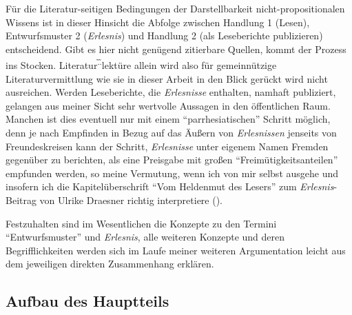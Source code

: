 \documentclass[fontsize=12pt]{scrartcl}
\begin{document}
F\"ur die Li\-te\-ra\-tur-seitigen Bedingungen der Darstellbarkeit nicht-pro\-po\-si\-ti\-o\-na\-len Wissens ist in dieser Hinsicht die Abfolge zwischen Handlung 1 (Lesen), Entwurfsmuster 2 (\textit{Erlesnis}) und Handlung 2 (als Leseberichte pu\-bli\-zieren) entscheidend. Gibt es \mbox{hier} nicht gen\"ugend zitierbare Quellen, kommt der Prozess ins Stocken. Li\-te\-ra\-tur\textsuperscript{\~.\~.}lekt\"ure allein wird also f\"ur gemeinn\"utzige Li\-te\-ra\-tur\-ver\-mitt\-lung wie sie in dieser Arbeit in den Blick ger\"uckt wird nicht ausreichen. Werden Leseberichte, die \textit{Erlesnisse} enthalten, namhaft pu\-bli\-ziert, gelangen aus meiner Sicht sehr wertvolle Aussagen in den \"of\-fent\-lichen Raum. Manchen ist dies eventuell nur mit einem "`parrhesiatischen"' Schritt m\"oglich, denn je nach Empfinden in Bezug auf das \"Au{\ss}ern von \textit{Erlesnissen} jenseits von Freund\textsuperscript{\tiny *}eskreisen kann der Schritt, \textit{Erlesnisse} unter eigenem Namen Fremden gegen\"uber zu berichten, als eine Preisgabe mit gro{\ss}en "`Freim\"utigkeitsanteilen"' empfunden werden, so meine Vermutung, wenn ich von mir \mbox{selbst} ausgehe und insofern ich die Kapitel\"uberschrift "`Vom Heldenmut des Lesers"' zum \textit{Erlesnis}-Beitrag von Ulrike Draesner richtig interpretiere (\cite{Draesner2013}).

Festzuhalten sind im We\-sent\-lichen die Konzepte zu den Termini "`Entwurfsmuster"' und \textit{Erlesnis}, alle weiteren Konzepte und deren Begrifflichkeiten werden sich im Laufe meiner weiteren Argumentation leicht aus dem jeweiligen direkten Zusammenhang erkl\"aren.

\subsection{Aufbau des Hauptteils}
\label{subsec:2.8}
\end{document}
